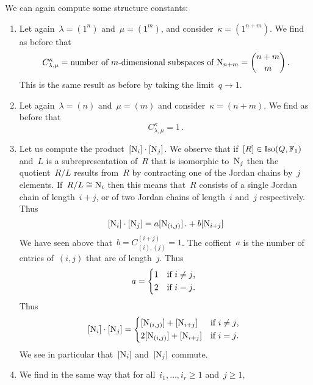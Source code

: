 \documentclass[a4paper,11pt]{scrartcl}
\begin{document}
\begin{example}
  \label{computing multiplication over F1}
  We can again compute some structure constants:
  \begin{enumerate}
    \item
      Let again~$\lambda = (1^n)$ and~$\mu = (1^m)$, and consider~$\kappa = (1^{n+m})$.
      We find as before that
      \[
        C^{\kappa}_{\lambda, \mu}
        =
        \text{number of~\dimensional{$m$} subspaces of~$\Nil_{n+m}$}
        =
        \binom{n+m}{m} \,.
      \]
      This is the same result as before by taking the limit~$q \to 1$.
    \item
      Let again~$\lambda = (n)$ and~$\mu = (m)$ and consider~$\kappa = (n+m)$.
      We find as before that
      \[
        C^{\kappa}_{\lambda, \mu} = 1 \,.
      \]
    \item
      Let us compute the product~$[\mathrm{N}_i] \cdot [\mathrm{N}_j]$.
      We observe that if~$[R] \in \operatorname{Iso}(Q, \mathbb{F}_1)$ and~$L$ is a subrepresentation of~$R$ that is isomorphic to~$\mathrm{N}_j$ then the quotient~$R/L$ results from~$R$ by contracting one of the Jordan chains by~$j$ elements.
      If~$R/L \cong \mathrm{N}_i$ then this means that~$R$ consists of a single Jordan chain of length~$i+j$, or of two Jordan chains of length~$i$ and~$j$ respectively.
      Thus
      \[
        [\mathrm{N}_i] \cdot [\mathrm{N}_j]
        =
        a [ \mathrm{N}_{(i,j)} ] \,.
        +
        b [ \mathrm{N}_{i+j} ]
      \]
      We have seen above that~$b = C^{(i+j)}_{(i),(j)} = 1$.
      The coffient~$a$ is the number of entries of~$(i,j)$ that are of length~$j$.
      Thus
      \[
        a
        =
        \begin{cases*}
          1
          &
          if~$i \neq j$,
          \\
          2
          &
          if~$i = j$.
        \end{cases*}
      \]
      Thus
      \[
        \class{\Nil_i} \cdot \class{\Nil_j}
        =
        \begin{cases*}
          \class{\Nil_{(i,j)}} + \class{\Nil_{i+j}}
          &
          if~$i \neq j$,
          \\
          2 \class{\Nil_{(i,j)}} + \class{\Nil_{i+j}}
          &
          if~$i = j$.
        \end{cases*}
      \]
      We see in particular that~$[\mathrm{N}_i]$ and~$[\mathrm{N}_j]$ commute.
    \item
      We find in the same way that for all~$i_1, \dotsc, i_r \geq 1$ and~$j \geq 1$,

\end{enumerate}
\end{example}
\end{document}
